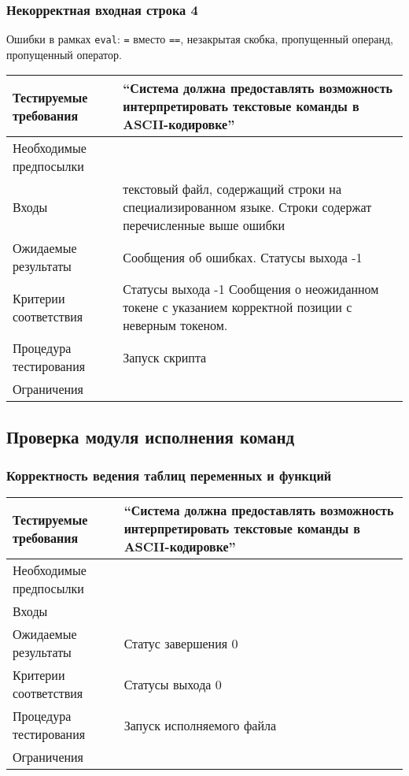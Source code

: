 \documentclass[a4paper, 12pt]{article}
\begin{document}
	\subsubsection{Некорректная входная строка 4} %
	Ошибки в рамках {\tt eval}: {\tt =} вместо {\tt ==}, незакрытая скобка,
	пропущенный операнд, пропущенный оператор.

	\begin{table}[H]
		\centering
		\begin{tabular}{|l|p{4in}|}
			\hline
			Тестируемые требования	&``Система должна предоставлять возможность интерпретировать текстовые
			команды в ASCII-кодировке''\\
			\hline
			Необходимые предпосылки	&\\
			\hline
			Входы			&текстовый файл, содержащий строки на специализированном языке.\newline
			Строки содержат перечисленные выше ошибки\\
			\hline
			Ожидаемые результаты	&Сообщения об ошибках. Статусы выхода -1\\
			\hline
			Критерии соответствия	&Статусы выхода -1\newline
			Сообщения о неожиданном токене с указанием корректной позиции 
			с неверным токеном.\\
			\hline
			Процедура тестирования	&Запуск скрипта\\
			\hline
			Ограничения		&\\
			\hline
		\end{tabular}
	\end{table}
\subsection{Проверка модуля исполнения команд} %
\subsubsection{Корректность ведения таблиц переменных и функций} %

\begin{table}[H]
	\centering
	\begin{tabular}{|l|p{4in}|}
		\hline
		Тестируемые требования	&``Система должна предоставлять возможность интерпретировать текстовые
		команды в ASCII-кодировке''\\
		\hline
		Необходимые предпосылки	&\\
		\hline
		Входы			&\\
		\hline
		Ожидаемые результаты	&Статус завершения 0\\
		\hline
		Критерии соответствия	&Статусы выхода 0\newline\\
		\hline
		Процедура тестирования	&Запуск исполняемого файла\\
		\hline
		Ограничения		&\\
		\hline
	\end{tabular}
\end{table}
\end{document}
